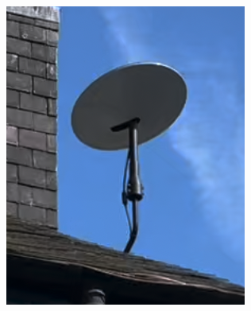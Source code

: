 \begin{figure}
    \centering
    \begin{subfigure}{.2\textwidth}
        \centering\includegraphics[width=\textwidth]{img/unstowed.png}\\\vspace{.35em}

\end{subfigure}
\end{figure}
